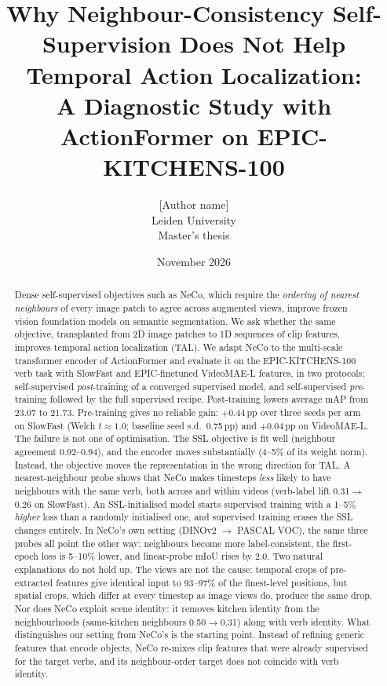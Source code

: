 \documentclass[10pt,a4paper]{article}
\title{\textbf{Why Neighbour-Consistency Self-Supervision Does Not Help\\Temporal Action Localization:\\A Diagnostic Study with ActionFormer on EPIC-KITCHENS-100}}
\author{[Author name] \\ \small Leiden University \\ \small Master's thesis}
\date{November 2026}
\newcommand{\pp}{\,pp}
\begin{document}
\maketitle

\begin{abstract}
\noindent
Dense self-supervised objectives such as NeCo, which require the \emph{ordering of
nearest neighbours} of every image patch to agree across augmented views, improve
frozen vision foundation models on semantic segmentation. We ask whether the same
objective, transplanted from 2D image patches to 1D sequences of clip features, improves
temporal action localization (TAL). We adapt NeCo to the multi-scale transformer encoder
of ActionFormer and evaluate it on the EPIC-KITCHENS-100 verb task with SlowFast and
EPIC-finetuned VideoMAE-L features, in two protocols: self-supervised \emph{post}-training
of a converged supervised model, and self-supervised \emph{pre}-training followed by the
full supervised recipe. Post-training lowers average mAP from 23.07 to 21.73. Pre-training
gives no reliable gain: $+0.44$\pp{} over three seeds per arm on SlowFast (Welch
$t\approx1.0$; baseline seed s.d.\ 0.75\pp) and $+0.04$\pp{} on VideoMAE-L. The failure is
not one of optimisation. The SSL objective is fit well (neighbour agreement 0.92--0.94),
and the encoder moves substantially (4--5\% of its weight norm). Instead, the objective
moves the representation in the wrong direction for TAL. A nearest-neighbour probe shows
that NeCo makes timesteps \emph{less} likely to have neighbours with the same verb, both across and
within videos (verb-label lift 0.31$\rightarrow$0.26 on SlowFast). An SSL-initialised
model starts supervised training with a 1--5\% \emph{higher} loss than a randomly
initialised one, and supervised training erases the SSL changes entirely. In NeCo's own
setting (DINOv2 $\rightarrow$ PASCAL VOC), the same three probes all point the other way:
neighbours become more label-consistent, the first-epoch loss is 5--10\% lower, and
linear-probe mIoU rises by 2.0. Two natural explanations do not hold up. The views are
not the cause: temporal crops of pre-extracted features give identical input to 93--97\%
of the finest-level positions, but spatial crops, which differ at every timestep as image
views do, produce the same drop. Nor does NeCo exploit scene identity: it removes kitchen
identity from the neighbourhoods (same-kitchen neighbours 0.50$\rightarrow$0.31) along
with verb identity. What distinguishes our setting from NeCo's is the starting point.
Instead of refining generic features that encode objects, NeCo re-mixes clip features
that were already supervised for the target verbs, and its neighbour-order target does not
coincide with verb identity.
\end{abstract}
\end{document}
